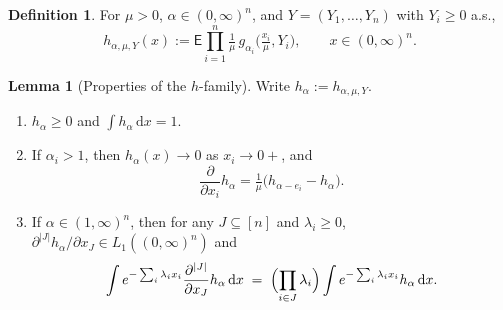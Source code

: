\documentclass[14pt]{extarticle}
\theoremstyle{definition}
\newtheorem{lemma}[theorem]{Lemma}
\newtheorem{definition}[theorem]{Definition}
\newcommand{\EE}{\mathsf{E}}
\newcommand{\dd}{\mathrm{d}}
\begin{document}
\begin{definition}\label{def:h_family}
  For $\mu>0$, $\alpha\in(0,\infty)^n$, and
  $Y=(Y_1,\ldots,Y_n)$ with $Y_i\geqslant 0$ a.s.,
  \[
    h_{\alpha,\mu,Y}(x)
    :=\EE\prod_{i=1}^n
      \tfrac{1}{\mu}\,g_{\alpha_i}\!\bigl(\tfrac{x_i}{\mu},Y_i\bigr),
    \qquad x\in(0,\infty)^n.
  \]
\end{definition}

\begin{lemma}[Properties of the $h$-family]\label{lem:proph}
  Write $h_\alpha:=h_{\alpha,\mu,Y}$.
  \begin{enumerate}[label=(\roman*)]
    \item $h_\alpha\geqslant 0$ and $\int h_\alpha\,\dd x=1$.
    \item If $\alpha_i>1$, then $h_\alpha(x)\to 0$ as $x_i\to 0+$,
      and
      \begin{equation}\label{eq:deriv_h}
        \frac{\partial}{\partial x_i}h_\alpha=\tfrac{1}{\mu}\bigl(h_{\alpha-e_i}-h_\alpha\bigr).
      \end{equation}
    \item If $\alpha\in(1,\infty)^n$, then for any $J\subseteq[n]$
      and $\lambda_i\geqslant 0$,
      $\partial^{|J|}h_\alpha/\partial x_J\in L_1((0,\infty)^n)$ and
      \begin{equation}\label{eq:proph_iii}
        \int e^{-\sum_i\lambda_ix_i}
          \frac{\partial^{|J|}}{\partial x_J}h_\alpha\,\dd x
        \;=\;
        \Bigl(\prod_{i\in J}\lambda_i\Bigr)
        \int e^{-\sum_i\lambda_ix_i}h_\alpha\,\dd x.
      \end{equation}
  \end{enumerate}
\end{lemma}
\end{document}
